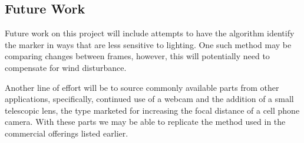 \documentclass[conference]{IEEEtran}
\begin{document}
\subsection{Future Work}

Future work on this project will include attempts to have the algorithm identify the marker in ways that are less sensitive to lighting.
One such method may be comparing changes between frames,
however, this will potentially need to compensate for wind disturbance.

Another line of effort will be to source commonly available parts from other applications, specifically, continued use of a webcam and the addition of a small telescopic lens, the type marketed for increasing the focal distance of a cell phone camera.
With these parts we may be able to replicate the method used in the commercial offerings listed earlier.





\end{document}
